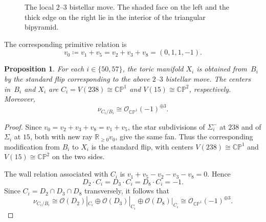 \documentclass[10pt,a4paper]{amsart}
\newtheorem{proposition}[theorem]{Proposition}
\numberwithin{equation}{section}
\newcommand{\R}{\mathbb R}
\newcommand{\cO}{\mathcal O}
\newcommand{\CP}{\mathbb{CP}}
\begin{document}
\begin{figure}[t]
    \caption{The local $2$--$3$ bistellar move. The shaded face on the left and the thick edge on the right lie in the interior of the triangular bipyramid.}
    \label{fig:bistellar}
\end{figure}
The corresponding primitive relation is
$$
    v_0 \coloneq v_1+v_5=v_2+v_3+v_8=(0,1,1,-1).
$$

\begin{proposition}\label{prop:common-flip}
    For each $i\in\{50,57\}$, the toric manifold $X_i$ is obtained from~$B_i$ by the standard flip corresponding to the above $2$--$3$ bistellar move.
    The centers in~$B_i$ and $X_i$ are $C_i=V(238)\cong\CP^1$ and $V(15)\cong\CP^2$, respectively.
    Moreover,
    $$
        \nu_{C_i/B_i}\cong\cO_{\CP^1}(-1)^{\oplus3}.
    $$
\end{proposition}
\begin{proof}
    Since $v_0=v_2+v_3+v_8=v_1+v_5$, the star subdivisions of $\Sigma_i^-$ at $238$ and of $\Sigma_i$ at $15$, both with new ray $\R_{\geq0}v_0$, give the same fan.
    Thus the corresponding modification from $B_i$ to $X_i$ is the standard flip, with centers $V(238)\cong\CP^1$ and $V(15)\cong\CP^2$ on the two sides.

    The wall relation associated with $C_i$ is $v_1+v_5-v_2-v_3-v_8=0$.
    Hence
    $$
        D_2\cdot C_i=D_3\cdot C_i=D_8\cdot C_i=-1.
    $$
    Since $C_i=D_2\cap D_3\cap D_8$ transversely, it follows that
    $$
        \nu_{C_i/B_i} \cong \cO(D_2)|_{C_i}\oplus \cO(D_3)|_{C_i}\oplus \cO(D_8)|_{C_i} \cong \cO_{\CP^1}(-1)^{\oplus3}.
    $$
\end{proof}
\end{document}
